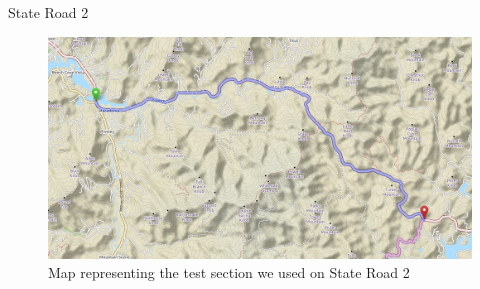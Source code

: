 \documentclass{beamer}
\begin{document}
\begin{frame}{State Road 2}
    \begin{figure}
        \centering
        \includegraphics[width=0.8\linewidth]{figures/map_sr2.png}
        \caption{Map representing the test section we used on State Road 2}
        \label{fig:map_sr2}
    \end{figure}{}
\end{frame}{}
\end{document}
